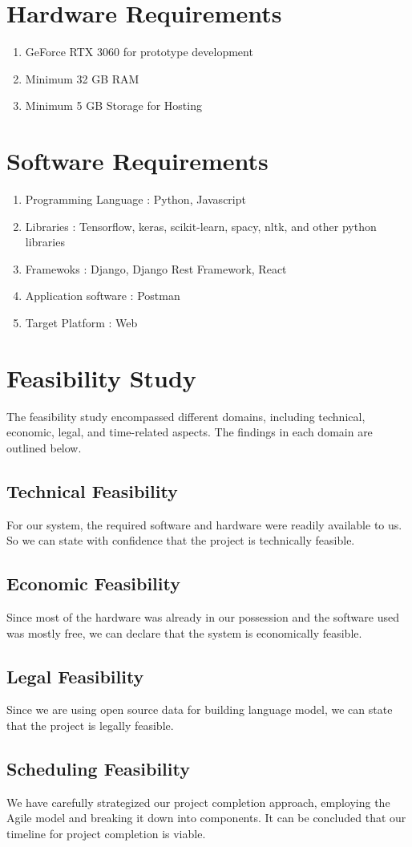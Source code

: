 \section{Hardware Requirements}
\begin{enumerate}
    \item GeForce RTX 3060 for prototype development 
    \item Minimum 32 GB RAM 
    \item Minimum 5 GB Storage for Hosting
\end{enumerate}

\section{Software Requirements}
\begin{enumerate}
    \item Programming Language : Python, Javascript
    \item Libraries : Tensorflow, keras, scikit-learn, spacy, nltk, and other python libraries 
    \item Framewoks : Django, Django Rest Framework, React
    \item Application software : Postman
    \item Target Platform : Web 
\end{enumerate}

\section{Feasibility Study}
The feasibility study encompassed different domains, including technical, economic, legal, and time-related aspects. The findings in each domain are outlined below.


\subsection{Technical Feasibility}
For our system, the required software and hardware were readily available to us. So we can state with confidence that the project is technically feasible.

\subsection{Economic Feasibility}
Since most of the hardware was already in our possession and the software used was mostly free, we can declare that the system is economically feasible.

\subsection{Legal Feasibility}
Since we are using open source data for building language model, we can state that the project is legally feasible.

\subsection{Scheduling Feasibility}
We have carefully strategized our project completion approach, employing the Agile model and breaking it down into components. It can be concluded that our timeline for project completion is viable.




